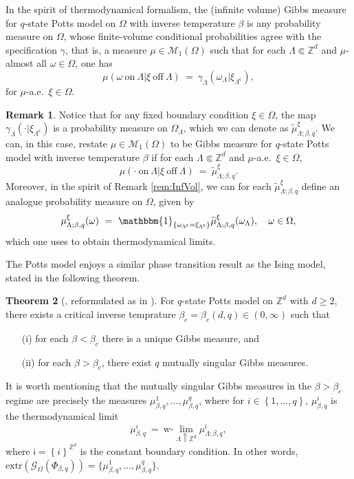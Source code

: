 \documentclass[12pt]{article}
\newcommand{\G}{\mathcal{G}}
\newcommand{\M}{\mathcal{M}}
\newcommand{\Z}{\mathbb{Z}}
\newcommand{\set}[1]{\left\{#1\right\}}
\newcommand{\pika}{\boldsymbol{\cdot}}
\newcommand{\1}{\mathbbm{1}}
\renewcommand{\c}{\mathsf{c}}
\newcommand{\5}{\vspace{0.5cm}}
\renewcommand{\tilde}{\widetilde}
\theoremstyle{definition}
\newtheorem{thm}{Theorem}[section]
\newtheorem{rem}[thm]{Remark}
\begin{document}
In the spirit of thermodynamical formalism, the (infinite volume) Gibbs measure for $q$-state Potts model on $\Omega$ with inverse temperature $\beta$ is any probability measure on $\Omega$, whose finite-volume conditional probabilities agree with the specification $\gamma$, that is, a measure $\mu\in\M_1(\Omega)$ such that for each $\Lambda\Subset\Z^d$ and $\mu$-almost all $\omega\in\Omega$, one has
$$\mu(\omega~\text{on}~\Lambda|\xi~\text{off}~\Lambda) ~=~ \gamma_\Lambda(\omega_\Lambda|\xi_{\Lambda^\c}),$$
for $\mu$-a.e.~$\xi\in\Omega$.

\begin{rem}
Notice that for any fixed boundary condition $\xi\in\Omega$, the map $\gamma_\Lambda(\pika|\xi_{\Lambda^\c})$ is a probability measure on $\Omega_\Lambda$, which we can denote as $\tilde{\mu}_{\Lambda;\beta,q}^\xi$. We can, in this case, restate $\mu\in\M_1(\Omega)$ to be Gibbs measure for $q$-state Potts model with inverse temperature $\beta$ if for each $\Lambda\Subset\Z^d$ and $\mu$-a.e.~$\xi\in\Omega$, 
$$\mu(\pika~\text{on}~\Lambda|\xi~\text{off}~\Lambda) ~=~ \tilde{\mu}_{\Lambda;\beta,q}^\xi.$$
Moreover, in the spirit of Remark \ref{rem:InfVol}, we can for each $\tilde{\mu}_{\Lambda;\beta,q}^\xi$ define an analogue probability measure on $\Omega$, given by
$$\mu_{\Lambda;\beta,q}^\xi(\omega) ~=~ \1_{\set{\omega_{\Lambda^\c}=\xi_{\Lambda^\c}}}\tilde{\mu}_{\Lambda;\beta,q}^\xi(\omega_\Lambda), \quad \omega\in\Omega,$$
which one uses to obtain thermodynamical limits.
\end{rem}

The Potts model enjoys a similar phase transition result as the Ising model,  stated in the following theorem.

\begin{thm}[\cite{ACCN}, reformulated as in \cite{GHM}]
For $q$-state Potts model on $\Z^d$ with $d\geq 2$, there exists a critical inverse temprature $\beta_c=\beta_c(d,q)\in(0,\infty)$ such that
\begin{itemize}
	\item[(i)] for each $\beta<\beta_c$ there is a unique Gibbs measure, and 
	\item[(ii)] for each $\beta>\beta_c$, there exist $q$ mutually singular Gibbs measures. 
\end{itemize}
\end{thm}

It is worth mentioning that the mutually singular Gibbs measures in the $\beta>\beta_c$ regime are precisely the measures $\mu_{\beta,q}^1,\ldots,\mu_{\beta,q}^q$, where for $i\in\set{1,\ldots,q}$, $\mu_{\beta,q}^i$ is the thermodynamical limit
$$\mu_{\beta,q}^i ~=~ \text{w-}\!\!\lim_{\Lambda\Uparrow\Z^d}\mu_{\Lambda;\beta,q}^{\mathsf{i}},$$
where $\mathsf{i}=\set{i}^{\Z^d}$ is the constant boundary condition. In other words, $\mathrm{extr}(\G_{\Omega}(\Phi_{\beta,q}))=\{\mu_{\beta,q}^1,\ldots,\mu_{\beta,q}^q\}$.
\end{document}
